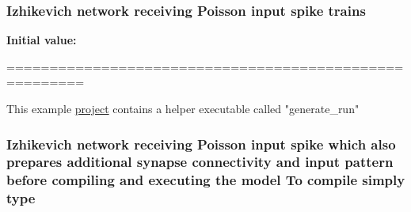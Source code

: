 \hypertarget{userproject_2PoissonIzh__project_2README_8txt_a70fb202ea6a76601f3326d3d09f0ef15}{
\subsubsection[{trains}]{\setlength{\rightskip}{0pt plus 5cm}Izhikevich {\bf network} receiving Poisson input spike trains}}\label{userproject_2PoissonIzh__project_2README_8txt_a70fb202ea6a76601f3326d3d09f0ef15}
{\bfseries Initial value\+:}
\begin{DoxyCode}
=======================================================

This example \hyperlink{userproject_2MBody1__project_2README_8txt_a6be7686af1c095c33166a32d892865dc}{project} contains a helper executable called \textcolor{stringliteral}{"generate\_run"}
\end{DoxyCode}
\hypertarget{userproject_2PoissonIzh__project_2README_8txt_a18700dbf29429942d4c3eda1e02fdef7}{
\subsubsection[{type}]{\setlength{\rightskip}{0pt plus 5cm}Izhikevich {\bf network} receiving Poisson input spike which also prepares additional synapse connectivity and input pattern before compiling and executing the {\bf model} To compile simply type}}\label{userproject_2PoissonIzh__project_2README_8txt_a18700dbf29429942d4c3eda1e02fdef7}
